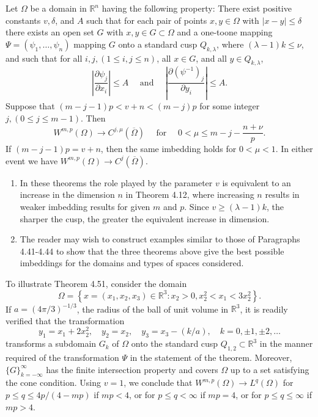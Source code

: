 \begin{theorem}
  Let $\Omega$ be a domain in $\mathbb{R}^n$ having the following property:
  There exist positive constants $v, \delta$, and $A$ such that for each pair of points $x, y \in \Omega$
  with $|x-y| \leq \delta$ there exists an open set $G$ with $x, y \in G \subset \Omega$ and a one-toone mapping 
  $\Psi=\left(\psi_1, \ldots, \psi_n\right)$ mapping $G$ onto a standard cusp $Q_{k, \lambda}$,
  where $(\lambda-1) k \leq \nu$, and such that for all $i, j,(1 \leq i, j \leq n)$, all $x \in G$,
  and all $y \in Q_{k, \lambda}$,
  \[
  \left|\frac{\partial \psi_j}{\partial x_i}\right| \leq A \quad \text { and } \quad\left|\frac{\partial\left(\psi^{-1}\right)_j}{\partial y_i}\right| \leq A .
  \]
  Suppose that $(m-j-1) p<v+n<(m-j) p$ for some integer $j,(0 \leq j \leq m-1)$. Then
  \[
  W^{m,p}(\Omega) \rightarrow C^{j, \mu}(\overline{\Omega}) \quad \text { for } \quad 0<\mu \leq m-j-\frac{n+\nu}{p} .
  \]
  If $(m-j-1) p=v+n$, then the same imbedding holds for $0<\mu<1$. In either event we have $W^{m,p}(\Omega) \rightarrow C^j(\overline{\Omega})$.
\end{theorem}


\begin{remarks}
  \begin{enumerate}
    \item In these theorems the role played by the parameter $v$ is equivalent to an increase
      in the dimension $n$ in Theorem 4.12, where increasing $n$ results in weaker imbedding results for
      given $m$ and $p$. Since $v \geq(\lambda-1) k$, the sharper the cusp, the greater the equivalent increase 
      in dimension.
    \item The reader may wish to construct examples similar to those of Paragraphs 4.41-4.44 to show that the 
      three theorems above give the best possible imbeddings for the domains and types of spaces considered.
  \end{enumerate}
\end{remarks}


\begin{example}
  To illustrate Theorem 4.51, consider the domain
  \[
  \Omega=\left\{x=\left(x_1, x_2, x_3\right) \in \mathbb{R}^3: x_2>0, x_2^2<x_1<3 x_2^2\right\} .
  \]
  If $a=(4 \pi / 3)^{-1 / 3}$, the radius of the ball of unit volume in $\mathbb{R}^3$, it is readily verified
  that the transformation
  \[
  y_1=x_1+2 x_2^2, \quad y_2=x_2, \quad y_3=x_3-(k / a), \quad k=0, \pm 1, \pm 2, \ldots
  \]
  transforms a subdomain $G_k$ of $\Omega$ onto the standard cusp $Q_{1,2} \subset \mathbb{R}^3$ in the manner 
  required of the transformation $\Psi$ in the statement of the theorem. Moreover, $\{G\}_{k=-\infty}^{\infty}$ 
  has the finite intersection property and covers $\Omega$ up to a set satisfying the cone condition.
  Using $v=1$, we conclude that $W^{m,p}(\Omega) \rightarrow L^q(\Omega)$ for $p \leq q \leq 4 p /(4-m p)$
  if $m p<4$, or for $p \leq q<\infty$ if $m p=4$, or for $p \leq q \leq \infty$ if $m p>4$.
\end{example}


